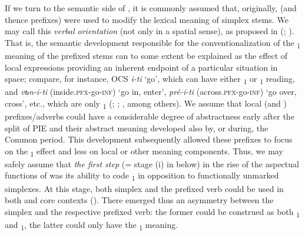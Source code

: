 \documentclass[output=paper]{langsci/langscibook}
\begin{document}
If we turn to the semantic side of , it is commonly assumed that, originally,  (and thence prefixes) were used to modify the lexical meaning of simplex stems. We may call this \textit{verbal orientation} (not only in a spatial sense), as proposed in \citeauthor{Plungjan2000} (\citeyear[176, 291]{Plungjan2000}; \citeyear{Plungjan2002}). That is, the semantic development responsible for the conventionalization of the \textsubscript{1} meaning of the prefixed stems can to some extent be explained as the effect of local expressions providing an inherent endpoint of a particular situation in space; compare, for instance, OCS \textit{i-ti} ‘go’, which can have either \textsubscript{1} or \textsubscript{1} reading, and \textit{v}\textit{ъ}\textit{n}\textit{-i-ti} (inside.\textsc{pfx}-go-\textsc{inf)} ‘go in, enter’, \textit{prě-i-ti} (across.\textsc{pfx}-go-\textsc{inf)} ‘go over, cross’, etc., which are only \textsubscript{1} (\citealt{Maslov2004[1959]}; \citealt[163]{Silina1982}; \citealt[466]{Bermel1997}, among others). We assume that local (and ) prefixes/adverbs could have a considerable degree of abstractness early after the split of PIE and their abstract meaning developed also by, or during, the Common  period. This development subsequently allowed these prefixes to focus on the \textsubscript{1} effect and less on local or other meaning components. Thus, we may safely assume that \textit{the first step} (= stage (i) in  below) in the rise of the aspectual functions of  was its ability to code \textsubscript{1} in opposition to functionally unmarked simplexes. At this stage, both simplex and the prefixed verb could be used in both  and  core contexts (\citealt{Maslov2004[1959]}). There emerged thus an asymmetry between the simplex and the respective prefixed verb: the former could be construed as both \textsubscript{1} and \textsubscript{1}, the latter could only have the \textsubscript{1} meaning.
\end{document}
